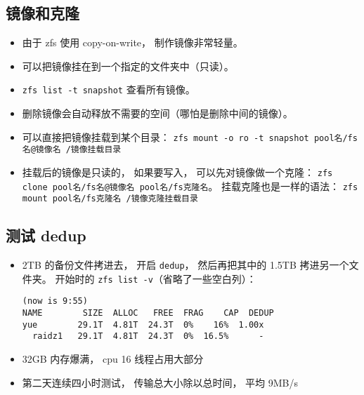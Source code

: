 \subsection{镜像和克隆}
\begin{itemize}
\item 由于 zfs 使用 copy-on-write， 制作镜像非常轻量。
\item 可以把镜像挂在到一个指定的文件夹中（只读）。
\item \verb|zfs list -t snapshot| 查看所有镜像。
\item 删除镜像会自动释放不需要的空间（哪怕是删除中间的镜像）。
\item 可以直接把镜像挂载到某个目录： \verb|zfs mount -o ro -t snapshot pool名/fs名@镜像名 /镜像挂载目录|
\item 挂载后的镜像是只读的， 如果要写入， 可以先对镜像做一个克隆： \verb|zfs clone pool名/fs名@镜像名 pool名/fs克隆名|。 挂载克隆也是一样的语法： \verb|zfs mount pool名/fs克隆名 /镜像克隆挂载目录|
\end{itemize}

\subsection{测试 dedup}
\begin{itemize}
\item 2TB 的备份文件拷进去， 开启 \verb|dedup|， 然后再把其中的 1.5TB 拷进另一个文件夹。 开始时的 \verb|zfs list -v|（省略了一些空白列）：
\begin{lstlisting}[language=none]
(now is 9:55)
NAME        SIZE  ALLOC   FREE  FRAG    CAP  DEDUP
yue        29.1T  4.81T  24.3T  0%    16%  1.00x
  raidz1   29.1T  4.81T  24.3T  0%  16.5%      -
\end{lstlisting}
\item 32GB 内存爆满， cpu 16 线程占用大部分
\item 第二天连续四小时测试， 传输总大小除以总时间， 平均 9MB/s
\end{itemize}
